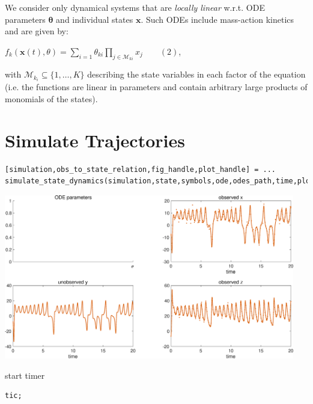 \begin{par}
We consider only dynamical systems that are \textit{locally linear} w.r.t. ODE parameters $\boldsymbol\theta$ and individual states $\mathbf{x}$. Such ODEs include mass-action kinetics and are given by:
\end{par} \vspace{1em}
\begin{par}
$f_{k}(\mathbf{x}(t),\theta) = \sum_{i=1} \theta_{ki} \prod_{j \in\mathcal{M}_{ki}} x_j \qquad (2)$,
\end{par} \vspace{1em}

\noindent with $\mathcal{M}_{k_i} \subseteq \{ 1, \dots, K\}$ describing the state variables in each factor of the equation (i.e. the functions are linear in parameters and contain arbitrary large products of monomials of the states).

\section{Simulate Trajectories}

\color{RoyalPurple}\begin{verbatim}
[simulation,obs_to_state_relation,fig_handle,plot_handle] = ...
simulate_state_dynamics(simulation,state,symbols,ode,odes_path,time,plot_settings);
\end{verbatim} 
\color{black}

{\centering
\includegraphics [width=5in]{VGM_for_Lorenz_Attractor_01.eps}

}

\begin{par}
start timer
\end{par} \vspace{1em}
\color{RoyalPurple}\begin{verbatim}
tic;
\end{verbatim} 
\color{black}


